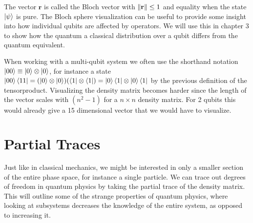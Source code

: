 The vector $\mathbf{r}$ is called the Bloch vector with $\norm{\mathbf{r}} \leq 1$ and equality when the state $\ket{\psi}$ is pure. The Bloch sphere visualization can be useful to provide some insight into how individual qubits are affected by operators. We will use this in chapter 3 to show how the quantum a classical distribution over a qubit differs from the quantum equivalent.\newline

\noindent When working with a multi-qubit system we often use the shorthand notation $\ket{00}\equiv \ket{0} \otimes \ket{0}$, for instance a state $\ket{00}\bra{11} = (\ket{0}\otimes \ket{0}) (\bra{1}\otimes \bra{1}) = \ket{0}\bra{1} \otimes \ket{0}\bra{1}$ by the previous definition of the tensorproduct. Visualizing the density matrix becomes harder since the length of the vector scales with $(n^2 - 1)$ for a $n\times n$ density matrix. For 2 qubits this would already give a 15 dimensional vector that we would have to visualize.

\section{Partial Traces}\label{sec:partial_tr}

Just like in classical mechanics, we might be interested in only a smaller section of the entire phase space, for instance a single particle. We can trace out degrees of freedom in quantum physics by taking the partial trace of the density matrix. This will outline some of the strange properties of quantum physics, where looking at subsystems decreases the knowledge of the entire system, as opposed to increasing it. \newline


